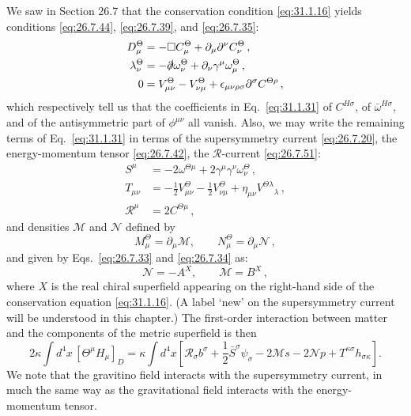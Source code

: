 We saw in Section 26.7 that the conservation condition
\eqref{eq:31.1.16} yields conditions \eqref{eq:26.7.44},
\eqref{eq:26.7.39}, and \eqref{eq:26.7.35}:
\[
  \begin{aligned}
  D_\mu^\Theta
  &=-\Box C_\mu^\Theta+\partial_\mu\partial^\nu C_\nu^\Theta\,,
  \\
  \lambda_\nu^\Theta
  &=-\sl{\partial}\omega_\nu^\Theta
    +\partial_\nu\gamma^\mu\omega_\mu^\Theta\,,
  \\
  0
  &=V_{\mu\nu}^\Theta-V_{\nu\mu}^\Theta
    +\epsilon_{\mu\nu\rho\sigma}\partial^\sigma C^{\Theta\rho}\,,
  \end{aligned}
\]
which respectively tell us that the coefficients in Eq.~\eqref{eq:31.1.31}
of \(C^{H\sigma}\), of \(\bar\omega^{H\sigma}\), and of the antisymmetric
part of \(\phi^{\mu\nu}\) all vanish. Also, we may write the remaining terms
of Eq.~\eqref{eq:31.1.31} in terms of the supersymmetry current
\eqref{eq:26.7.20}, the energy-momentum tensor \eqref{eq:26.7.42}, the
\(\mathcal{R}\)-current \eqref{eq:26.7.51}:
\[
  \begin{aligned}
  S^\mu
  &=-2\omega^{\Theta\mu}
    +2\gamma^\mu\gamma^\nu\omega_\nu^\Theta\,,
  \\
  T_{\mu\nu}
  &=-\frac12V_{\mu\nu}^\Theta-\frac12V_{\nu\mu}^\Theta
    +\eta_{\mu\nu}V^{\Theta\lambda}{}_\lambda\,,
  \\
  \mathcal{R}^\mu&=2C^{\Theta\mu}\,,
  \end{aligned}
\]
and densities \(\mathcal{M}\) and \(\mathcal{N}\) defined by
\begin{equation}
  M_\mu^\Theta=\partial_\mu\mathcal{M},\qquad
  N_\mu^\Theta=\partial_\mu\mathcal{N}\,,
  \tag{31.1.32}\label{eq:31.1.32}
\end{equation}
and given by Eqs.~\eqref{eq:26.7.33} and \eqref{eq:26.7.34} as:
\begin{equation}
  \mathcal{N}=-A^X,\qquad
  \mathcal{M}=B^X\,,
  \tag{31.1.33}\label{eq:31.1.33}
\end{equation}
where \(X\) is the real chiral superfield appearing on the right-hand side of
the conservation equation \eqref{eq:31.1.16}. (A label `new' on the
supersymmetry current will be understood in this chapter.) The first-order
interaction between matter and the components of the metric superfield is
then
\begin{equation}
  2\kappa\int d^4x\,[\Theta^\mu H_\mu]_D
  =\kappa\int d^4x
  \left[
    \mathcal{R}_\sigma b^\sigma
    +\frac12\bar S^\sigma\psi_\sigma
    -2\mathcal{M}s-2\mathcal{N}p
    +T^{\kappa\sigma}h_{\sigma\kappa}
  \right].
  \tag{31.1.34}\label{eq:31.1.34}
\end{equation}
We note that the gravitino field interacts with the supersymmetry current, in
much the same way as the gravitational field interacts with the
energy-momentum tensor.

